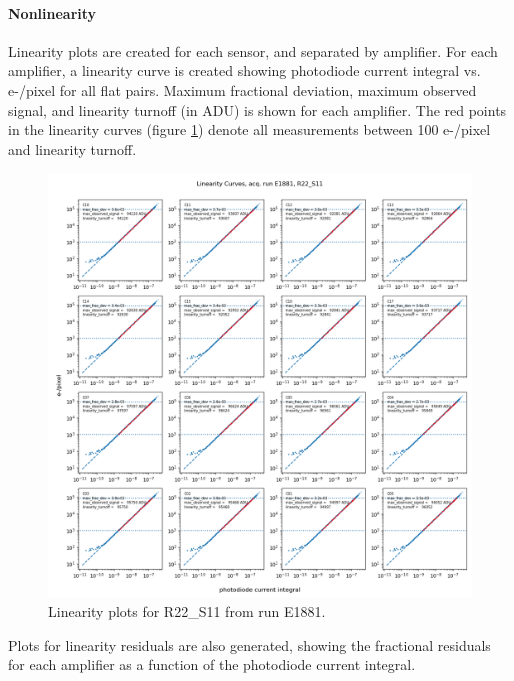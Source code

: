 \paragraph{Nonlinearity}

Linearity plots are created for each sensor, and separated by amplifier. For each amplifier, a linearity curve is created showing photodiode current integral vs. e-/pixel for all flat pairs. Maximum fractional deviation, maximum observed signal, and linearity turnoff (in ADU) is shown for each amplifier. The red points in the linearity curves (figure \ref{fig:ref:linearity}) denote all measurements between 100 e-/pixel and linearity turnoff.

\begin{figure}
    \centering
    \includegraphics[width=0.8\linewidth]{figures/ReferenceFigures/linearity_fit_plot_LSSTCam_R22_S11_u_lsstccs_eo_linearity_plots_E1881_w_2024_35_20241105T131453Z.png}
    \caption{Linearity plots for R22\_S11 from run E1881.}
    \label{fig:ref:linearity}
\end{figure}
\clearpage
Plots for linearity residuals are also generated, showing the fractional residuals for each amplifier as a function of the photodiode current integral.

